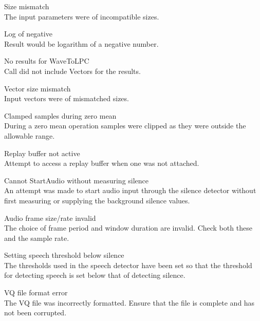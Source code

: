 \begin{itemize}
\begin{itemize}
    Size mismatch\\
        The input parameters were of incompatible sizes.

    Log of negative\\
        Result would be logarithm of a negative number.

\end{itemize}


\begin{itemize}
    No results for WaveToLPC\\
        Call did not include Vectors for the results.

    Vector size mismatch\\
        Input vectors were of mismatched sizes.

    Clamped samples during zero mean\\
        During a zero mean operation samples were clipped as they were outside
        the allowable range.

\end{itemize}


\begin{itemize}
    Replay buffer not active\\
        Attempt to access a replay buffer when one was not attached.

    Cannot StartAudio without measuring silence\\
        An attempt was made to start audio input through the silence detector 
        without first measuring or supplying the background silence values.

    Audio frame size/rate invalid\\
        The choice of frame period and window duration are invalid.  Check
        both these and the sample rate.

    Setting speech threshold below silence\\
        The thresholds used in the speech detector have been set so that the
        threshold for detecting speech is set below that of detecting silence.

\end{itemize}


\begin{itemize}
    VQ file format error\\
        The VQ file was incorrectly formatted.  Ensure that the file is 
        complete and has not been corrupted.


\end{itemize}
\end{itemize}
